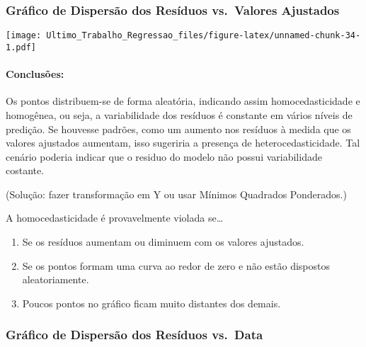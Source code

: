 \documentclass[
]{article}
\newenvironment{Shaded}{\begin{snugshade}}{\end{snugshade}}
\newcommand{\FunctionTok}[1]{\textcolor[rgb]{0.13,0.29,0.53}{\textbf{#1}}}
\newcommand{\NormalTok}[1]{#1}
\newcommand{\SpecialCharTok}[1]{\textcolor[rgb]{0.81,0.36,0.00}{\textbf{#1}}}
\providecommand{\tightlist}{%
  \setlength{\itemsep}{0pt}\setlength{\parskip}{0pt}}
\begin{document}
\hypertarget{gruxe1fico-de-dispersuxe3o-dos-resuxedduos-vs.-valores-ajustados}{%
\subsubsection{Gráfico de Dispersão dos Resíduos vs.~Valores
Ajustados}\label{gruxe1fico-de-dispersuxe3o-dos-resuxedduos-vs.-valores-ajustados}}

\begin{Shaded}
\end{Shaded}

\texttt{[image: Ultimo\_Trabalho\_Regressao\_files/figure-latex/unnamed-chunk-34-1.pdf]}

\hypertarget{conclusuxf5es}{%
\paragraph{Conclusões:}\label{conclusuxf5es}}

Os pontos distribuem-se de forma aleatória, indicando assim
homocedasticidade e homogênea, ou seja, a variabilidade dos resíduos é
constante em vários níveis de predição. Se houvesse padrões, como um
aumento nos resíduos à medida que os valores ajustados aumentam, isso
sugeriria a presença de heterocedasticidade. Tal cenário poderia indicar
que o residuo do modelo não possui variabilidade costante.

(Solução: fazer transformação em Y ou usar Mínimos Quadrados
Ponderados.)

A homocedasticidade é provavelmente violada se\ldots{}

\begin{enumerate}
\def\labelenumi{\arabic{enumi}.}
\tightlist
\item
  Se os resíduos aumentam ou diminuem com os valores ajustados.
\item
  Se os pontos formam uma curva ao redor de zero e não estão dispostos
  aleatoriamente.
\item
  Poucos pontos no gráfico ficam muito distantes dos demais.
\end{enumerate}

\hypertarget{gruxe1fico-de-dispersuxe3o-dos-resuxedduos-vs.-data}{%
\subsubsection{Gráfico de Dispersão dos Resíduos
vs.~Data}\label{gruxe1fico-de-dispersuxe3o-dos-resuxedduos-vs.-data}}
\end{document}

